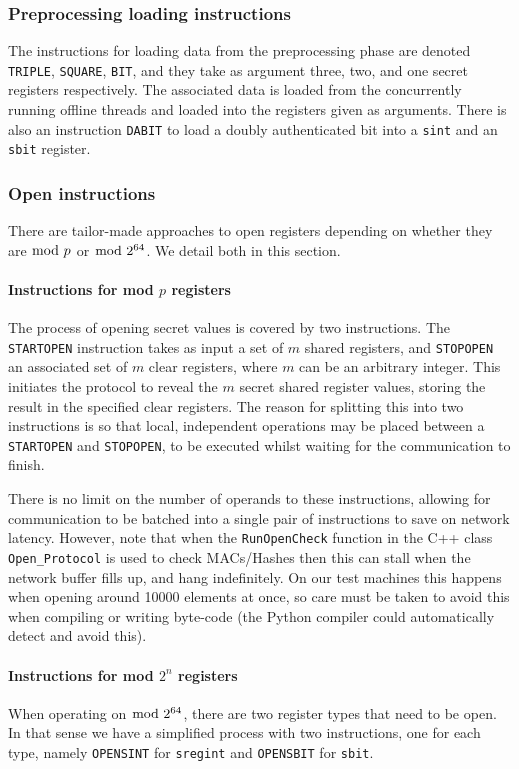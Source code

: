 \subsubsection{Preprocessing loading instructions}
The instructions for loading data from the preprocessing phase
are denoted \verb+TRIPLE+, \verb+SQUARE+, \verb+BIT+,
and they take as argument three, two, and one secret registers
respectively.
The associated data is loaded from the concurrently running
offline threads and loaded into the registers given as arguments.
There is also an instruction \verb+DABIT+ to load a doubly authenticated
bit into a \verb|sint| and an \verb|sbit| register.

\subsubsection{Open instructions}
There are tailor-made approaches to open registers depending on whether they are $\bmod \; p$ or $\bmod \; 2^{64}$. We detail both in this section.

\paragraph{Instructions for mod $p$ registers}
The process of opening secret values is covered by two instructions.
The \verb+STARTOPEN+ instruction takes as input a set of $m$
shared registers, and \verb+STOPOPEN+ an associated set of $m$
clear registers, where $m$ can be an arbitrary integer.
This initiates the protocol to reveal the $m$ secret shared register values,
storing the result in the specified clear registers. The reason for
splitting this into two instructions is so that local, independent
operations may be placed between a \verb+STARTOPEN+ and \verb+STOPOPEN+,
to be executed whilst waiting for the communication to finish.

There is no limit on the number of operands to these instructions,
allowing for communication to be batched into a single pair of
instructions to save on network latency. However, note that when
the \texttt{RunOpenCheck} function in the C++ class \texttt{Open\_Protocol}
is used to check MACs/Hashes then this can stall when the network buffer fills
up, and hang indefinitely.
On our test machines this happens when opening around 10000 elements
at once, so care must be taken to avoid this when compiling or writing
byte-code (the Python compiler could automatically detect and avoid
this).

\paragraph{Instructions for mod $2^n$ registers}
When operating on $\bmod \; 2^{64}$, there are two register types that need to be open.
In that sense we have a simplified process with two instructions, one for each type,
namely \verb+OPENSINT+ for \verb+sregint+ and \verb+OPENSBIT+ for \verb|sbit|.

